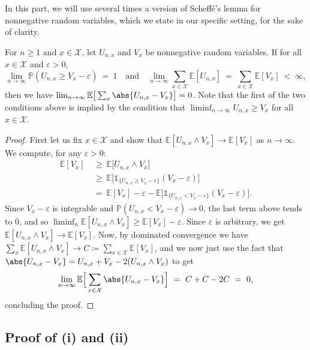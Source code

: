 \begin{refsegment}
In this part, we will use several times a version of Scheffé's lemma for nonnegative random variables, which we state in our specific setting, for the sake of clarity.
\begin{lem}\label{lem:special-Scheffe}
  For $n\geq 1$ and $x\in \mathcal{X}$, let $U_{n,x}$ and $V_x$ be nonnegative random variables.
  If for all $x\in \mathcal{X}$ and $\varepsilon>0$,
  \[
   \lim_{n\to\infty} \mathbb{P}(U_{n,x} \geq V_x-\varepsilon)\ =\ 1 \quad \text{and}\quad \lim_{n\to\infty} \sum_{x\in \mathcal{X}} \mathbb{E}[U_{n,x}]\ =\ \sum_{x\in \mathcal{X}}\mathbb{E}[V_x]\ <\ \infty,
  \]
  then we have $\lim_{n\to\infty}\mathbb{E}\big[\sum_x \abs{U_{n,x} - V_x}\big]= 0$.
  Note that the first of the two conditions above is implied by the condition that $\liminf_{n\to\infty} U_{n,x} \geq V_x$ for all $x\in \mathcal{X}$.
\end{lem}
%
\begin{proof}
  First let us fix $x\in \mathcal{X}$ and show that $\mathbb{E}[U_{n,x} \wedge V_x]\to \mathbb{E}[V_x]$ as $n\to\infty$.
  We compute, for any $\varepsilon>0$:
  \begin{align*}
    \mathbb{E}[V_x]\ &\geq\ \mathbb{E}\big[U_{n,x} \wedge V_x\big]\\
     &\geq\ \mathbb{E}\Big[\mathds{1}_{\{U_{n,x}\geq V_x-\varepsilon\}}(V_x-\varepsilon)\Big]\\
     & =\ \mathbb{E}[V_x]-\varepsilon - \mathbb{E}\Big[\mathds{1}_{\{U_{n,x}< V_x-\varepsilon\}}(V_x-\varepsilon)\Big].
  \end{align*}
  Since $V_x-\varepsilon$ is integrable and $\mathbb{P}(U_{n,x}< V_x-\varepsilon)\to 0$, the last term above tends to $0$, and so $\liminf_{n} \mathbb{E}[U_{n,x} \wedge V_x] \geq \mathbb{E}[V_x]-\varepsilon$.
  Since $\varepsilon$ is arbitrary, we get $\mathbb{E}[U_{n,x} \wedge V_x]\to \mathbb{E}[V_x]$.
  Now, by dominated convergence we have $\sum_x \mathbb{E}[U_{n,x} \wedge V_x] \to C \coloneqq \sum_{x\in \mathcal{X}}\mathbb{E}[V_x]$, and we now just use the fact that $\abs{U_{n,x} - V_x} = U_{n,x}+V_x-2(U_{n,x} \wedge V_x)$ to get
  \[
  \lim_{n\to\infty}  \mathbb{E}\Big[\sum_{x\in \mathcal{X}} \abs{U_{n,x} - V_x}\Big] \ =\ C+C-2C\ =\ 0,
  \]
  concluding the proof.
\end{proof}

\subsection{Proof of (i) and (ii)}


\end{refsegment}
